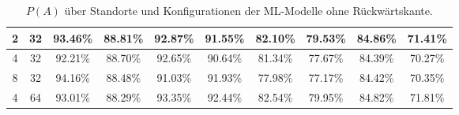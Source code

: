 \begin{table}
\begin{tabular}{ | c | c | c | c | c | c | c | c | c | c | }
        2 & 32 & 93.46\% & 88.81\% & 92.87\% & 91.55\% & 82.10\% & 79.53\% & 84.86\% & 71.41\% \\\hline
        4 & 32 & 92.21\% & 88.70\% & 92.65\% & 90.64\% & 81.34\% & 77.67\% & 84.39\% & 70.27\% \\\hline
        8 & 32 & 94.16\% & 88.48\% & 91.03\% & 91.93\% & 77.98\% & 77.17\% & 84.42\% & 70.35\% \\\hline
        4 & 64 & 93.01\% & 88.29\% & 93.35\% & 92.44\% & 82.54\% & 79.95\% & 84.82\% & 71.81\% \\\hline
    \end{tabular}
    \caption{$P(A)$ über Standorte und Konfigurationen der ML-Modelle ohne Rückwärtskante.}
    \label{tab:predictions_wo_feedback_edge_by_acc}
\end{table}
